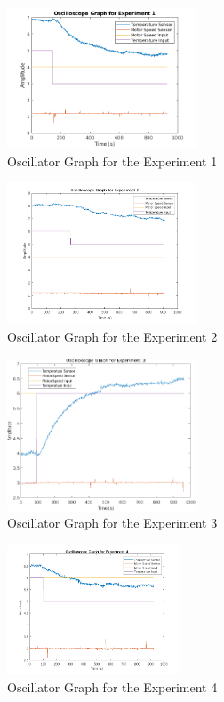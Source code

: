 \documentclass[11pt,a4paper,twocolumn]{article}
\begin{document}
\begin{figure}[H]
    \centering
    \includegraphics[width=0.5\textwidth]{Graphs/Exp1Osc.png}
    \caption{Oscillator Graph for the Experiment 1}
    \label{fig:exp1OutputGraph}
\end{figure}
\begin{figure}[H]
    \centering
    \includegraphics[width=0.5\textwidth]{Graphs/Exp2Osc.png}
    \caption{Oscillator Graph for the Experiment 2}
    \label{fig:exp2OutputGraph}
\end{figure}
\begin{figure}[H]
    \centering
    \includegraphics[width=0.5\textwidth]{Graphs/Exp3Osc.png}
    \caption{Oscillator Graph for the Experiment 3}
    \label{fig:exp3OutputGraph}
\end{figure}
\begin{figure}[H]
    \centering
    \includegraphics[width=0.46\textwidth]{Graphs/Exp4Osc.png}
    \caption{Oscillator Graph for the Experiment 4}
    \label{fig:exp4OutputGraph}
\end{figure}
\end{document}
